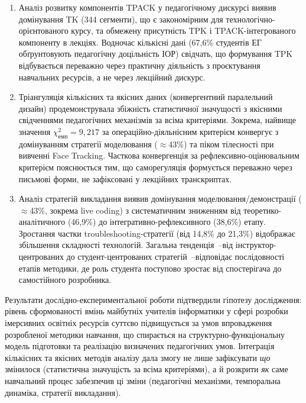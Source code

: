\begin{enumerate}[label=\arabic*.]
\item Аналіз розвитку компонентів TPACK у педагогічному дискурсі виявив домінування TK (344 сегменти), що є закономірним для технологічно-орієнтованого курсу, та обмежену присутність TPK і TPACK-інтегрованого компоненту в лекціях. Водночас кількісні дані (67,6\% студентів ЕГ обґрунтовують педагогічну доцільність ІОР) свідчать, що формування TPK відбувається переважно через практичну діяльність з проєктування навчальних ресурсів, а не через лекційний дискурс.

\item Тріангуляція кількісних та якісних даних (конвергентний паралельний дизайн) продемонструвала збіжність статистичної значущості з якісними свідченнями педагогічних механізмів за всіма критеріями. Зокрема, найвище значення $\chi^2_{\text{емп}} = 9{,}217$ за операційно-діяльнісним критерієм конвергує з домінуванням стратегії моделювання ($\approx$43\%) та піком тілесності при вивченні Face Tracking. Часткова конвергенція за рефлексивно-оцінювальним критерієм пояснюється тим, що саморегуляція формується переважно через письмові форми, не зафіксовані у лекційних транскриптах.

\item Аналіз стратегій викладання виявив домінування моделювання/демонстрації ($\approx$43\%, зокрема live coding) з систематичним зниженням від теоретико-аналітичного (46,9\%) до інтегративно-рефлексивного (38,6\%) етапу. Зростання частки troubleshooting-стратегії (від 14,8\% до 21,3\%) відображає збільшення складності технологій. Загальна тенденція~--від інструктор-центрованих до студент-центрованих стратегій~--відповідає послідовності етапів методики, де роль студента поступово зростає від спостерігача до самостійного розробника.
\end{enumerate}

Результати дослідно-експериментальної роботи підтвердили гіпотезу дослідження: рівень сформованості вмінь майбутніх учителів інформатики у сфері розробки імерсивних освітніх ресурсів суттєво підвищується за умов впровадження розробленої методики навчання, що спирається на структурно-функціональну модель підготовки та реалізацію визначених педагогічних умов. Інтеграція кількісних та якісних методів аналізу дала змогу не лише зафіксувати \textit{що} змінилося (статистична значущість за всіма критеріями), а й розкрити \textit{як} саме навчальний процес забезпечив ці зміни (педагогічні механізми, темпоральна динаміка, стратегії викладання).
